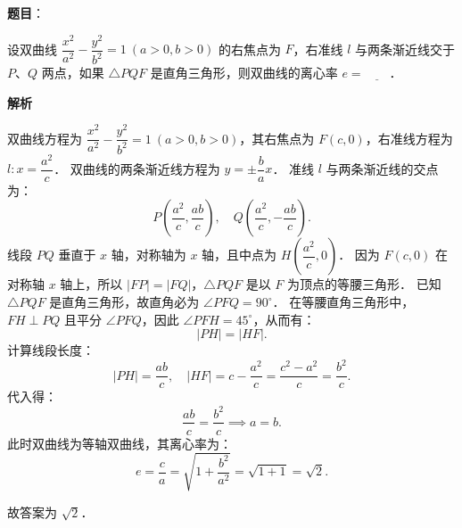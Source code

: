 \begin{answer}

\textbf{题目}：

设双曲线 $\dfrac{x^2}{a^2} - \dfrac{y^2}{b^2} = 1\ (a > 0, b > 0)$ 的右焦点为 $F$，右准线 $l$ 与两条渐近线交于 $P$、$Q$ 两点，如果 $\triangle PQF$ 是直角三角形，则双曲线的离心率 $e = \underline{\hspace{2em}}$．

\textbf{解析}

双曲线方程为 $\dfrac{x^2}{a^2} - \dfrac{y^2}{b^2} = 1\ (a > 0, b > 0)$，其右焦点为 $F(c, 0)$，右准线方程为 $l: x = \dfrac{a^2}{c}$．
双曲线的两条渐近线方程为 $y = \pm \dfrac{b}{a} x$．
准线 $l$ 与两条渐近线的交点为：
\nopagebreak[4]
\[
P\left(\dfrac{a^2}{c}, \dfrac{ab}{c}\right), \quad Q\left(\dfrac{a^2}{c}, -\dfrac{ab}{c}\right).
\]
线段 $PQ$ 垂直于 $x$ 轴，对称轴为 $x$ 轴，且中点为 $H\left(\dfrac{a^2}{c}, 0\right)$．
因为 $F(c, 0)$ 在对称轴 $x$ 轴上，所以 $|FP| = |FQ|$，$\triangle PQF$ 是以 $F$ 为顶点的等腰三角形．
已知 $\triangle PQF$ 是直角三角形，故直角必为 $\angle PFQ = 90^\circ$．
在等腰直角三角形中，$FH \perp PQ$ 且平分 $\angle PFQ$，因此 $\angle PFH = 45^\circ$，从而有：
\nopagebreak[4]
\[
|PH| = |HF|.
\]
计算线段长度：
\nopagebreak[4]
\[
|PH| = \dfrac{ab}{c}, \quad |HF| = c - \dfrac{a^2}{c} = \dfrac{c^2 - a^2}{c} = \dfrac{b^2}{c}.
\]
代入得：
\nopagebreak[4]
\[
\dfrac{ab}{c} = \dfrac{b^2}{c} \implies a = b.
\]
此时双曲线为等轴双曲线，其离心率为：
\nopagebreak[4]
\[
e = \dfrac{c}{a} = \sqrt{1 + \dfrac{b^2}{a^2}} = \sqrt{1 + 1} = \sqrt{2}.
\]

故答案为 $\sqrt{2}$．


\end{answer}
